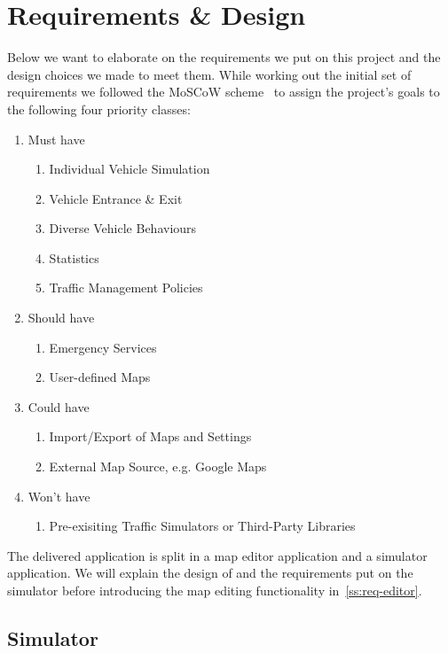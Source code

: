 \section{Requirements \& Design}\label{sec:reqs}
Below we want to elaborate on the requirements we put on this project and the design choices we made to meet them. While working out the initial set of requirements we followed the MoSCoW scheme~\cite{brennan2009} to assign the project's goals to the following four priority classes:
\begin{enumerate} \itemsep1pt \parskip0pt 
	\item{Must have}
		\begin{enumerate} \itemsep1pt \parskip0pt 
			\item{Individual Vehicle Simulation}
			\item{Vehicle Entrance \& Exit}
			\item{Diverse Vehicle Behaviours}
			\item{Statistics}
			\item{Traffic Management Policies}
		\end{enumerate}
	\item{Should have}
		\begin{enumerate} \itemsep1pt \parskip0pt 
			\item{Emergency Services}
			\item{User-defined Maps}
		\end{enumerate}
	\item{Could have}
		\begin{enumerate} \itemsep1pt \parskip0pt 
			\item{Import/Export of Maps and Settings}
			\item{External Map Source, e.g. Google Maps}
		\end{enumerate}
	\item{Won't have}
		\begin{enumerate} \itemsep1pt \parskip0pt 
			\item{Pre-exisiting Traffic Simulators or Third-Party Libraries}
		\end{enumerate}
\end{enumerate}

The delivered application is split in a map editor application and a simulator application. We will explain the design of and the requirements put on the simulator before introducing the map editing functionality in~\ref{ss:req-editor}.

\subsection{Simulator}
